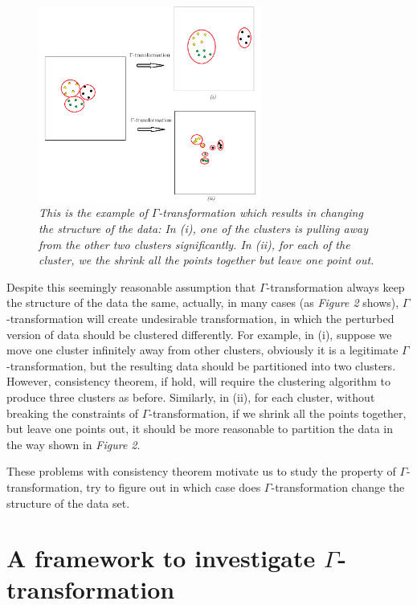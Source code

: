 \documentclass{uonmathreport}
\begin{document}
\begin{figure}[H]
 \begin{center}
   \includegraphics[width=0.65\textwidth]{Paper_figure_2.png}
 \end{center}
 \caption{\textit{This is the example of $\Gamma$-transformation which results in changing the structure of the data: In (i), one of the clusters is pulling away from the other two clusters significantly. In (ii), for each of the cluster, we the shrink all the points together but leave one point out.}}
 \label{fig:bsd2}
\end{figure}

Despite this seemingly reasonable assumption that $\Gamma$-transformation always keep the structure of the data the same, actually, in many cases (as \textit{Figure 2} shows), $\Gamma$-transformation will create undesirable transformation, in which the perturbed version of data should be clustered differently. For example, in (i), suppose we move one cluster infinitely away from other clusters, obviously it is a legitimate $\Gamma$-transformation, but the resulting data should be partitioned into  two clusters. However, consistency theorem, if hold, will require the clustering algorithm to produce three clusters as before. Similarly, in (ii), for each cluster, without breaking the constraints of $\Gamma$-transformation, if we shrink all the points together, but leave one points out, it should be more reasonable to partition the data in the way shown in \textit{Figure 2}.

These problems with consistency theorem motivate us to study the property of $\Gamma$-transformation, try to figure out in which case does $\Gamma$-transformation change the structure of the data set.
\section{A framework to investigate $\Gamma$-transformation} \label{sec:framework}
\end{document}
